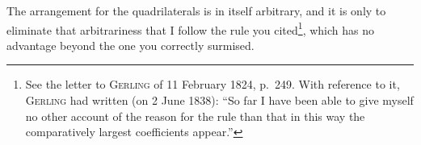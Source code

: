 The arrangement for the quadrilaterals is in itself arbitrary, and it is
only to eliminate that arbitrariness that I follow the rule you
cited\def\letterfivestars{***}\footnote{See the letter to \textsc{Gerling} of 11 February 1824, p.\ 249. With reference to it,
\textsc{Gerling} had written (on 2 June 1838): “So far I have been able to give myself no other account of the reason
for the rule than that in this way the comparatively largest coefficients appear.”}, which has no advantage beyond the one you correctly surmised.
\endgroup
